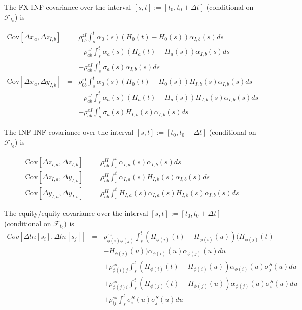 The FX-INF covariance over the interval $[s,t] := [t_0, t_0+\Delta t]$ (conditional on $\mathcal{F}_{t_0}$) is

\begin{eqnarray*}
  \mathrm{Cov}[ \Delta x_a, \Delta z_{I,b} ] & = & \rho_{0b}^{zI} \int_s^t \alpha_0(s) (H_0(t)-H_0(s)) \alpha_{I,b}(s) ds \\
                                             & & -\rho_{ab}^{zI} \int_s^t \alpha_a(s)(H_a(t)-H_a(s))\alpha_{I,b}(s) ds \\
                                             & & +\rho_{ab}^{xI}\int_s^t \sigma_a(s) \alpha_{I,b}(s) ds \\
  \mathrm{Cov}[ \Delta x_a, \Delta y_{I,b} ] & = & \rho_{0b}^{zI} \int_s^t \alpha_0(s) (H_0(t)-H_0(s)) H_{I,b}(s)\alpha_{I,b}(s) ds \\
                                             & & -\rho_{ab}^{zI} \int_s^t \alpha_a(s)(H_a(t)-H_a(s))H_{I,b}(s)\alpha_{I,b}(s) ds \\
                                             & & +\rho_{ab}^{xI}\int_s^t \sigma_a(s) H_{I,b}(s)\alpha_{I,b}(s) ds
\end{eqnarray*}

The INF-INF covariance over the interval $[s,t] := [t_0, t_0+\Delta t]$ (conditional on $\mathcal{F}_{t_0}$) is

\begin{eqnarray*}
  \mathrm{Cov}[ \Delta z_{I,a}, \Delta z_{I,b} ] & = & \rho_{ab}^{II} \int_s^t \alpha_{I,a}(s) \alpha_{I,b}(s) ds \\
  \mathrm{Cov}[ \Delta z_{I,a}, \Delta y_{I,b} ] & = & \rho_{ab}^{II} \int_s^t \alpha_{I,a}(s) H_{I,b}(s)
                                                       \alpha_{I,b}(s) ds \\
  \mathrm{Cov}[ \Delta y_{I,a}, \Delta y_{I,b} ] & = & \rho_{ab}^{II} \int_s^t H_{I,a}(s) \alpha_{I,a}(s) H_{I,b}(s) \alpha_{I,b}(s) ds
\end{eqnarray*}

The equity/equity covariance over the interval $[s,t] := [t_0, t_0+\Delta t]$ (conditional on $\mathcal{F}_{t_0}$) is
\begin{eqnarray*}
	Cov \left[\Delta ln[s_i], \Delta ln[s_j] \right] &=&
	\rho_{\phi(i) \phi(j)}^{zz}\int_s^t (H_{\phi(i)} (t) - H_{\phi(i)} (u)) (H_{\phi(j)} (t)\\
	&& - H_{\phi(j)} (u)) \alpha_{\phi(i)}(u) \alpha_{\phi(j)}(u) du\\
	&&+ \rho_{\phi(i) j}^{zs} \int_s^t (H_{\phi(i)} (t) - H_{\phi(i)} (u)) \alpha_{\phi(i)}(u) \sigma_j^S(u) du\\
	&&+ \rho_{\phi(j) i}^{zs} \int_s^t (H_{\phi(j)} (t) - H_{\phi(j)} (u)) \alpha_{\phi(j)}(u) \sigma_i^S(u) du\\
	&&+ \rho_{ij}^{ss} \int_s^t \sigma_i^S(u) \sigma_j^S(u) du\\
\end{eqnarray*}

